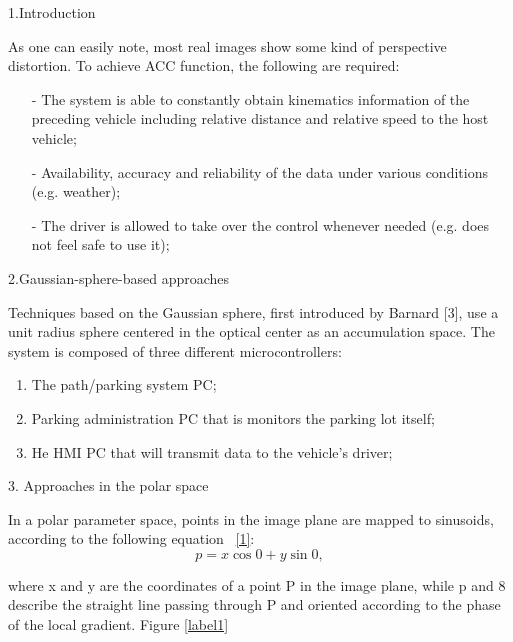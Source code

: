 \documentclass[12pt]{article}
\begin{document}
1.Introduction

\raggedright As one can easily note, most real images show some kind of perspective distortion. To achieve ACC function, the following are required:
\newline
\begin{itemize}
    \item[-] The system is able to constantly obtain kinematics information of the preceding vehicle including relative distance and relative speed to the host vehicle;
    \item[-] Availability, accuracy and reliability of the data under various conditions (e.g. weather);
    \item[-] The driver is allowed to take over the control whenever needed (e.g. does not feel safe to use it);
\end{itemize}
\hspace{5mm}
2.Gaussian-sphere-based approaches

\raggedright Techniques based on the Gaussian sphere, first introduced by Barnard [3], use a unit radius sphere centered in the optical center as an accumulation space. The system is composed of three different microcontrollers:
\noindent
\begin{enumerate}
\item The path/parking system PC;
\item Parking administration PC that is monitors the parking lot itself;
\item He HMI PC that will transmit data to the vehicle's driver;
\end{enumerate}

\hspace{5mm}
3. Approaches in the polar space

\raggedright In a polar parameter space, points in the image plane are mapped to sinusoids, according to the following equation ~\eqref{1}:
\noindent
\begin{equation}\label{1}
p=x\cos⁡0+y\sin⁡0,
\end{equation}

\raggedright where x and y are the coordinates of a point P in the image plane, while p and 8 describe the straight line passing through P and oriented according to the phase of the local gradient. Figure 
\ref{label1}
\noindent
\end{document}
